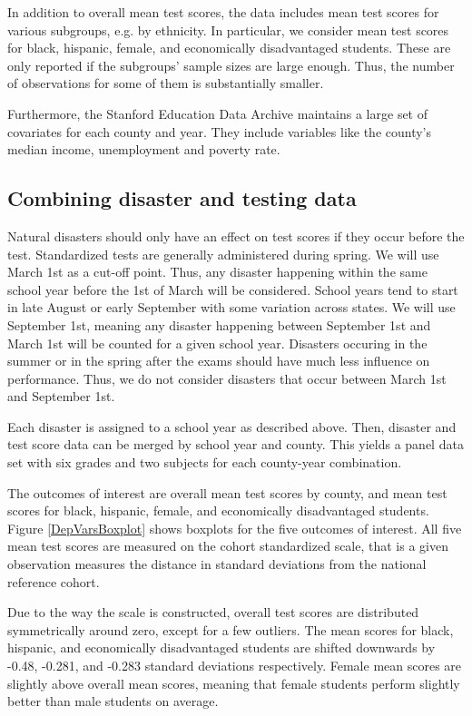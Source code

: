 In addition to overall mean test scores, the data includes mean test scores for various subgroups, e.g. by ethnicity. In particular, we consider mean test scores for black, hispanic, female, and economically disadvantaged students. These are only reported if the subgroups' sample sizes are large enough. Thus, the number of observations for some of them is substantially smaller.

Furthermore, the Stanford Education Data Archive maintains a large set of covariates for each county and year. They include variables like the county's median income, unemployment and poverty rate.


\subsection{Combining disaster and testing data}

Natural disasters should only have an effect on test scores if they occur before the test. Standardized tests are generally administered during spring. We will use March 1st as a cut-off point. Thus, any disaster happening within the same school year before the 1st of March will be considered. School years tend to start in late August or early September with some variation across states. We will use September 1st, meaning any disaster happening between September 1st and March 1st will be counted for a given school year. Disasters occuring in the summer or in the spring after the exams should have much less influence on performance. Thus, we do not consider disasters that occur between March 1st and September 1st.

Each disaster is assigned to a school year as described above. Then, disaster and test score data can be merged by school year and county. This yields a panel data set with six grades and two subjects for each county-year combination.

The outcomes of interest are overall mean test scores by county, and mean test scores for black, hispanic, female, and economically disadvantaged students. Figure \ref{DepVarsBoxplot} shows boxplots for the five outcomes of interest. All five mean test scores are measured on the cohort standardized scale, that is a given observation measures the distance in standard deviations from the national reference cohort. 

Due to the way the scale is constructed, overall test scores are distributed symmetrically around zero, except for a few outliers. The mean scores for black, hispanic, and economically disadvantaged students are shifted downwards by -0.48, -0.281, and -0.283 standard deviations respectively. Female mean scores are slightly above overall mean scores, meaning that female students perform slightly better than male students on average.

